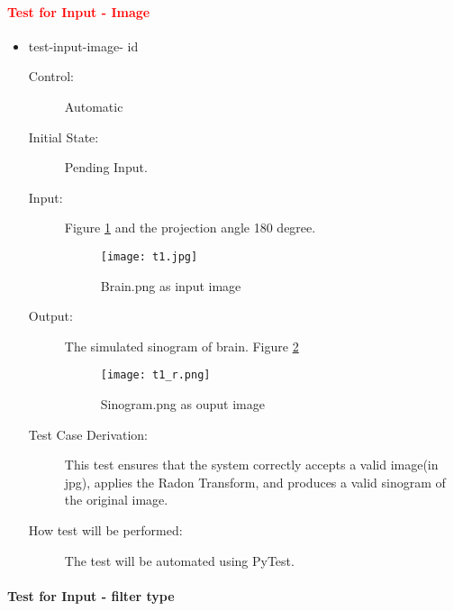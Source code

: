 \documentclass[12pt, titlepage]{article}
\newcounter{testnum}
\newcommand{\dthetestnum}{id\thetestnum}
\newcommand{\add}{\textcolor{red}}
\begin{document}
\paragraph{\add{Test for Input - Image}}
\begin{itemize}
\item test-input-image- \label{id1}\dthetestnum
\begin{description}
\item[Control:] Automatic

\item[Initial State:] Pending Input.

\item[Input:] Figure \ref{brain} and the projection angle 180 degree.
  \begin{figure}
      \centering
      \texttt{[image: t1.jpg]}
      \caption{Brain.png as input image}
      \label{brain}
  \end{figure}

\item[Output:] The simulated sinogram of brain. Figure \ref{sino}
    \begin{figure}
      \centering
      \texttt{[image: t1\_r.png]}
      \caption{Sinogram.png as ouput image}
      \label{sino}
  \end{figure}

\item[Test Case Derivation:] This test ensures that the system correctly accepts a
  valid image(in jpg), applies the Radon Transform, and produces a
  valid sinogram of the original image.

\item[How test will be performed:] The test will be automated using PyTest.
\end{description}
\end{itemize}

\paragraph{Test for Input - filter type}
\end{document}
